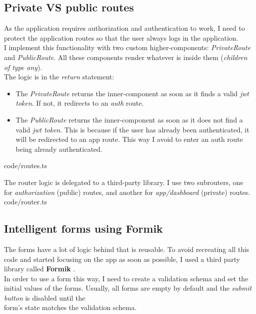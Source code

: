     \subsection{Private VS public routes}
        As the application requires authorization and authentication to work, I need to protect the application routes so that the user always logs in the application. \\

        I implement this functionality with two custom higher-components: \textit{PrivateRoute} and \textit{PublicRoute}. All these components render whatever is inside them (\textit{children of type any}). \\
        The logic is in the \textit{return} statement:
        \begin{itemize}[noitemsep]
            \item The \textit{PrivateRoute} returns the inner-component as soon as it finds a valid \textit{jwt token}. If not, it redirects to an \textit{auth} route.
            \item The \textit{PublicRoute} returns the inner-component as soon as it does not find a valid \textit{jwt token}. This is because if the user has already been authenticated, it will be redirected to an app route. This way I avoid to enter an auth route being already authenticated.
        \end{itemize}
        
        {code/routes.ts}

        The router logic is delegated to a third-party library. I use two subrouters, one for \textit{authorization} (public) routes, and another for \textit{app/dashboard} (private) routes. \\
        
        {code/router.ts}

    \subsection{Intelligent forms using Formik}
        The forms have a lot of logic behind that is reusable. To avoid recreating all this code and started focusing on the app as soon as possible, I used a third party library called \textbf{Formik} \cite{Formik}. \\
        In order to use a form this way, I need to create a validation schema and set the initial values of the forms. Usually, all forms are empty by default and the \textit{submit button} is disabled until the \\
        form's state matches the validation schema. \\


